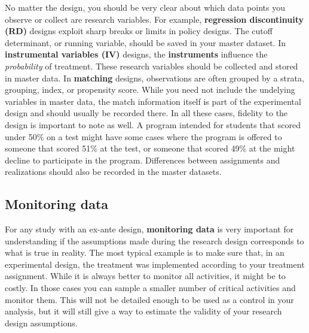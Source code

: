 No matter the design, you should be very clear about
which data points you observe or collect are research variables.
For example,
\textbf{regression discontinuity (RD)}
designs exploit sharp breaks or limits
in policy designs.
The cutoff determinant, or running variable,
should be saved in your master dataset.
In \textbf{instrumental variables (IV)}
designs, the \textbf{instruments} influence the \textit{probability} of treatment.
These research variables should be collected and stored in master data.
In \textbf{matching} designs, observations are often grouped
by a strata, grouping, index, or propensity score.
While you need not include the undelying variables in master data,
the match information itself is part of the experimental design
and should usually be recorded there.
In all these cases, fidelity to the design is important to note as well.
A program intended for students that scored under 50\% on a test
might have some cases where the program is offered to someone that scored 51\% at the test,
or someone that scored 49\% at the might decline to participate in the program.
Differences between assignments and realizations
should also be recorded in the master datasets.

\subsection{Monitoring data}

For any study with an ex-ante design,
\textbf{monitoring data}
is very important for understanding if the
assumptions made during the research design
corresponds to what is true in reality.
The most typical example is to make sure that,
in an experimental design,
the treatment was implemented according to your treatment assignment.
While it is always better to monitor all activities,
it might be to costly.
In those cases you can sample a smaller number of critical activities and monitor them.
This will not be detailed enough to be used as a control in your analysis,
but it will still give a way to
estimate the validity of your research design assumptions.

